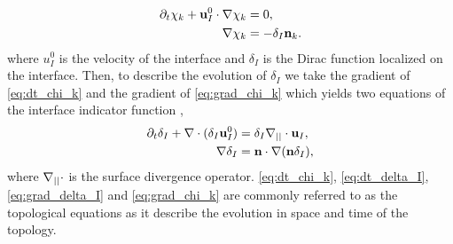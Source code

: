 \begin{align}
    \partial_t \chi_k
    + \textbf{u}_I^0 \cdot \mathbf{\nabla} \chi_k
    &= 0,
    \label{eq:dt_chi_k}\\
    \label{eq:grad_chi_k}
    \mathbf{\nabla} \chi_k
    &= - \delta_I \textbf{n}_k. 
\end{align}
where $u^0_I$ is the velocity of the interface and $\delta_I$ is the Dirac function localized on the interface.
Then, to describe the evolution of $\delta_I$ we take the gradient of \ref{eq:dt_chi_k} and the gradient of \ref{eq:grad_chi_k} which yields two equations of the interface indicator function \citep{morel2007surface},
\begin{align}
    \partial_t \delta_I
    + \mathbf{\nabla}\cdot (\delta_I \textbf{u}_I^0)
    &= \delta_I \mathbf{\nabla}_{||}\cdot \textbf{u}_I,
    \label{eq:dt_delta_I}\\
    \mathbf{\nabla}\delta_I 
    &= \textbf{n} \cdot \mathbf{\nabla} (\textbf{n} \delta_I),
    \label{eq:grad_delta_I}
\end{align}
where $\mathbf{\nabla}_{||}\cdot$ is the surface divergence operator. \ref{eq:dt_chi_k}, \ref{eq:dt_delta_I}, \ref{eq:grad_delta_I} and \ref{eq:grad_chi_k} are commonly referred to as the topological equations as it describe the evolution in space and time of the topology.

